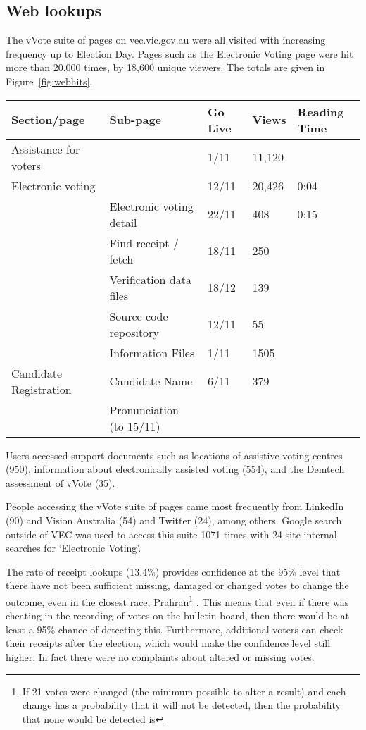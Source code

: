 \documentclass[twocolumn]{article}
\begin{document}
\subsection*{Web lookups}

The vVote suite of pages on vec.vic.gov.au were all visited with increasing frequency up to Election Day.  Pages such as the Electronic Voting page were hit more than 20,000 times, by 18,600 unique viewers.   The totals are given in Figure~\ref{fig:webhits}.
\begin{figure*}
\begin{center}
\begin{tabular}{lllll}
Section/page &	Sub-page	& Go Live	& Views	& Reading Time \\ \hline
Assistance for voters	 &&	1/11	& 11,120	\\ \hline
Electronic voting &&		12/11 &	20,426 &	0:04 \\ 
&	Electronic voting detail	& 22/11	& 408	& 0:15 \\
&	Find receipt / fetch	& 18/11	& 250	\\
&	Verification data files &	18/12 &	139	\\
&	Source code repository &	12/11 &	55	\\
&	Information Files &	1/11	& 1505	\\ \hline
Candidate Registration	& Candidate Name  &	6/11 & 	379	\\
& Pronunciation (to 15/11) 
\end{tabular}
\end{center}
\caption{VEC Electronic Voting web page hits: November 2014 -- January 2015}
\label{fig:webhits}
\end{figure*}



Users accessed support documents such as locations of assistive voting centres (950),  information about electronically assisted voting (554), and the Demtech assessment of vVote (35).  

People accessing the vVote suite of pages came most frequently from LinkedIn (90) and Vision Australia (54) and Twitter (24), among others.  Google search outside of VEC was used to access this suite 1071 times with 24 site-internal searches for `Electronic Voting'.

The rate of receipt lookups (13.4\%) provides confidence at the 95\% level that there have not been sufficient missing, damaged or changed votes to change the outcome, even in the closest race, Prahran\footnote{If 21 votes were changed (the minimum possible to alter a result) and each change has a  probability that it will not be detected, then the probability that none would be detected is } .  This means that even if there was cheating in the recording of votes on the bulletin board, then there would be at least a 95\% chance of detecting this.  Furthermore, additional voters can check their receipts after the election, which would make the confidence level still higher.  In fact there were no complaints about altered or missing votes.    
\end{document}
